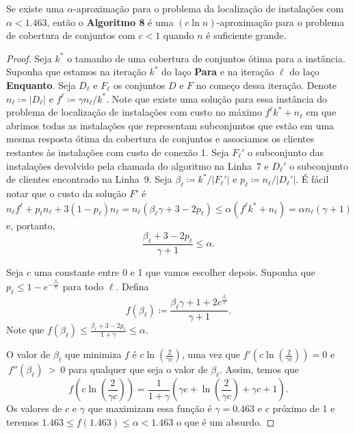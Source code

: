 \begin{theorem}
Se existe uma $\alpha$-aproximação para o problema da localização de instalações com $\alpha < 1.463$, então o {\bf Algoritmo 8} é uma $(c \ln n)$-aproximação para o problema de cobertura de conjuntos com $c<1$ quando $n$ é suficiente grande.
\end{theorem}

\begin{proof}
Seja $k^*$ o tamanho de uma cobertura de conjuntos ótima para a instância. Suponha que estamos na iteração $k^*$ do laço {\bf Para} e na iteração $\ell$ do laço {\bf Enquanto}.
Seja $D_\ell$ e $F_\ell$ os conjuntos $D$ e $F$ no começo dessa iteração. Denote $n_\ell \coloneqq |D_\ell|$ e $f^\ell \coloneqq \gamma n_\ell /k^*$. Note que existe uma solução para essa instância do problema de localização de instalações com custo no máximo $f^\ell k^* + n_\ell$ em que abrimos todas as instalações que representam subconjuntos que estão em uma mesma resposta ótima da cobertura de conjuntos e associamos os clientes restantes às instalações com custo de conexão 1.
Seja $F_\ell'$ o subconjunto das instalações devolvido pela chamada do algoritmo na Linha~7 e $D_\ell'$ o subconjunto de clientes encontrado na Linha~9. Seja $\beta_\ell \coloneqq k^*/|F_\ell'|$ e $p_\ell \coloneqq n_\ell / |D_\ell'|$. É fácil notar que o custo da solução $F'$ é
\[ n_\ell f^\ell+ p_\ell n_\ell + 3 (1-p_\ell) n_\ell = n_\ell(\beta_\ell \gamma + 3 - 2p_\ell) \leq \alpha ( f^\ell k^* + n_\ell) = \alpha n_\ell (\gamma + 1)\]
e, portanto, 
\begin{equation} 
    \label{inaprox:beta}
\frac{\beta_\ell + 3 - 2p_\ell}{\gamma + 1} \leq \alpha.
\end{equation}

Seja $c$ uma constante entre 0 e 1 que vamos escolher depois. Suponha que $p_\ell \leq 1 - e^{-\frac{\beta_\ell}{c}}$ para todo $\ell$. Defina 
\[f(\beta_\ell) \coloneqq \frac{\beta_\ell \gamma + 1 + 2e^{\frac{\beta_\ell}{c}}}{\gamma + 1}.\]
Note que $f(\beta_\ell) \leq \frac{\beta_\ell + 3 - 2p_\ell}{1 + \gamma} \leq \alpha$.

O valor de $\beta_\ell$ que minimiza $f$ é $c\ln(\frac{2}{\gamma c})$, uma vez que $f'(c\ln(\frac{2}{\gamma c})) = 0$ e $~f''(\beta_\ell)~>~0$ para qualquer que seja o valor de $\beta_\ell$. Assim, temos que 
\[f(c\ln\left(\frac{2}{\gamma c}\right)) = \frac{1}{1+\gamma} \left( \gamma c + \ln\left(\frac{2}{\gamma c}\right) + \gamma c + 1 \right).\]
Os valores de $c$ e $\gamma$ que maximizam essa função é $\gamma = 0.463$ e $c$ próximo de 1 e teremos $1.463 \leq f(1.463) \leq \alpha < 1.463$ o que é um absurdo.


\end{proof}
